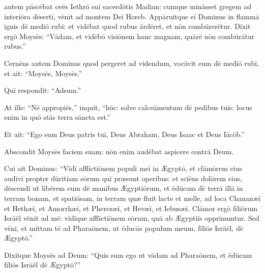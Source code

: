 
\thispagestyle{empty}

 autem pāscēbat ovēs Iethrō suī sacerdōtis Madian:
cumque mināsset gregem ad interiōra dēsertī,
vēnit ad montem Deī Horeb.
Appāruitque eī Dominus in flammā ignis dē mediō rubī:
et vidēbat quod rubus ārdēret, et nōn combūrerētur.
Dīxit ergō Moysēs: ``Vādam, et vidēbō vīsiōnem hanc magnam, quārē nōn combūrātur rubus.''

Cernēns autem Dominus quod pergeret ad videndum,
vocāvit eum dē mediō rubī, et ait: ``Moysēs, Moysēs.''

Quī respondit: ``Adsum.''

At ille: ``Nē appropiēs,'' inquit, ``hūc: solve calceāmentum dē pedibus tuīs: locus enim
in quō stās terra sāncta est.'' 

Et ait: ``Ego sum Deus patris tuī, Deus Abraham, Deus Isaac et Deus Iācōb.''

Abscondit Moysēs faciem suam: nōn enim audēbat aspicere contrā Deum.

Cui ait Dominus: ``Vīdī afflīctiōnem populī meī in Ægyptō,
et clāmōrem eius audīvī propter dūritiam eōrum quī præsunt operibus:
et sciēns dolōrem eius, dēscendī ut libērem eum dē manibus Ægyptiōrum,
et ēdūcam dē terrā illā in terram bonam, et spatiōsam,
in terram quæ fluit lacte et melle,
 ad loca Chananæī et Hethæī, et Amorrhæī, et Pherezæī, et Hevæī, et Iebusæī.
Clāmor ergō fīliōrum Isrāēl vēnit ad mē: vīdīque afflīctiōnem eōrum,
quā ab Ægyptiīs opprimuntur.
Sed vēnī, et mittam tē ad Pharaōnem,
ut ēducās populum meum, fīliōs Isrāēl, dē Ægyptō.''

Dīxitque Moysēs ad Deum: ``Quis sum ego ut vādam ad Pharaōnem,
et ēdūcam fīliōs Isrāēl dē Ægyptō?''

